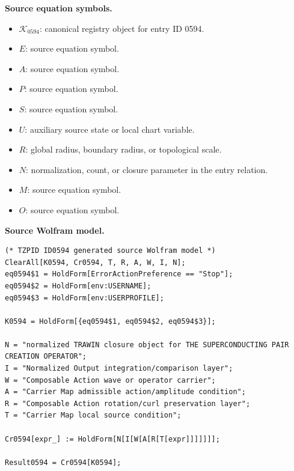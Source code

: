 \begin{minipage}[t]{0.49\linewidth}
\begingroup
\small
\raggedright
\textbf{Source equation symbols.}\par
\begin{itemize}[leftmargin=1.35em,itemsep=1pt,topsep=1pt,parsep=0pt]
    \item $\mathcal{K}_{0594}$: canonical registry object for entry ID 0594.
    \item $E$: source equation symbol.
    \item $A$: source equation symbol.
    \item $P$: source equation symbol.
    \item $S$: source equation symbol.
    \item $U$: auxiliary source state or local chart variable.
    \item $R$: global radius, boundary radius, or topological scale.
    \item $N$: normalization, count, or closure parameter in the entry relation.
    \item $M$: source equation symbol.
    \item $O$: source equation symbol.
\end{itemize}
\endgroup
\end{minipage}\hfill
\begin{minipage}[t]{0.47\linewidth}
\begingroup
\scriptsize
\raggedright
\textbf{Source Wolfram model.}\par
\begin{Verbatim}[fontsize=\tiny,breaklines=true,breakanywhere=true]
(* TZPID ID0594 generated source Wolfram model *)
ClearAll[K0594, Cr0594, T, R, A, W, I, N];
eq0594$1 = HoldForm[ErrorActionPreference == "Stop"];
eq0594$2 = HoldForm[env:USERNAME];
eq0594$3 = HoldForm[env:USERPROFILE];

K0594 = HoldForm[{eq0594$1, eq0594$2, eq0594$3}];

N = "normalized TRAWIN closure object for THE SUPERCONDUCTING PAIR CREATION OPERATOR";
I = "Normalized Output integration/comparison layer";
W = "Composable Action wave or operator carrier";
A = "Carrier Map admissible action/amplitude condition";
R = "Composable Action rotation/curl preservation layer";
T = "Carrier Map local source condition";

Cr0594[expr_] := HoldForm[N[I[W[A[R[T[expr]]]]]]];

Result0594 = Cr0594[K0594];
\end{Verbatim}
\endgroup
\end{minipage}

